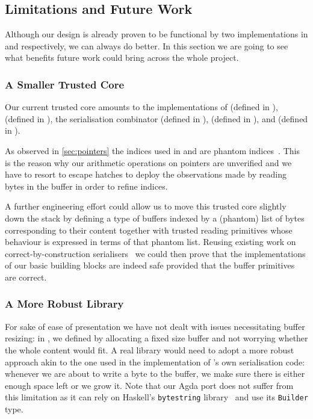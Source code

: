 \subsection{Limitations and Future Work}

Although our design is already proven to be functional by two implementations
in \idris{} and \agda{} respectively, we can always do better.
%
In this section we are going to see what benefits future work could bring
across the whole project.

\subsubsection{A Smaller Trusted Core}

Our current trusted core amounts to the implementations of
 (defined in ),
 (defined in ),
the serialisation combinator \IdrisFunction{(\#)} (defined in ),
 (defined in ),
and  (defined in ).


As observed in \cref{sec:pointers} the indices used in
 and 
are phantom indices~\citep{DBLP:conf/dsl/LeijenM99}.
%
This is the reason why our arithmetic operations on pointers are
unverified and we have to resort to escape hatches to deploy the
observations made by reading bytes in the buffer in order to
refine indices.

A further engineering effort could allow us to move this trusted
core slightly down the stack by defining a type of buffers indexed
by a (phantom) list of bytes corresponding to their content together
with trusted reading primitives whose behaviour is expressed
in terms of that phantom list.
%
Reusing existing work on correct-by-construction
serialisers~\citep{DBLP:conf/icfp/GeestS17} we could
then prove that the implementations of our basic building blocks are
indeed safe provided that the buffer primitives are correct.

\subsubsection{A More Robust Library}\label{sec:limitation-robust}

For sake of ease of presentation we have not dealt with issues necessitating
buffer resizing: in ,
we defined 
by allocating a fixed size buffer and not worrying whether the whole content
would fit.
%
A real library would need to adopt a more robust approach
akin to the one used in the implementation of \idris{}'s own serialisation
code: whenever we are about to write a byte to the buffer, we make sure there
is either enough space left or we grow it.
%
Note that our Agda port does not suffer from this limitation as it
can rely on Haskell's {\usestt\texttt{bytestring}}
library~\citep{DBLP:conf/padl/CouttsSL07} and use its
{\usestt\texttt{Builder}} type.

